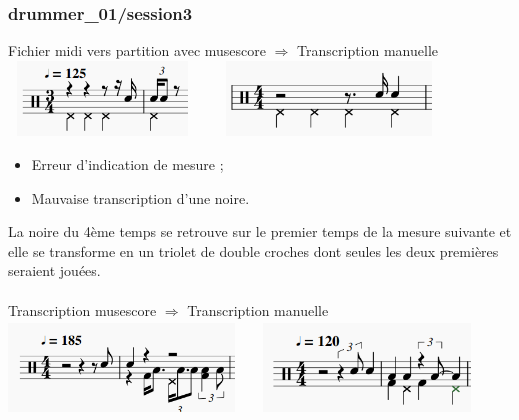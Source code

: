 \subsubsection{drummer\_01/session3}
Fichier midi vers partition avec musescore $\Rightarrow$ Transcription manuelle\\
\includegraphics[height=20mm, width=50mm]{z_images/4_experimentations/1_analyse_midi_audio/0_drummer1_session3/0_musescore.png}\ \ \ \ 
\includegraphics[height=20mm, width=55mm]{z_images/4_experimentations/1_analyse_midi_audio/0_drummer1_session3/1_manuelle.png}
\begin{itemize}
	\item Erreur d’indication de mesure ;
	\item Mauvaise transcription d’une noire.\\
\end{itemize}
La noire du 4ème temps se retrouve sur le premier temps de la mesure suivante et elle se transforme en un triolet de double croches dont seules les deux premières seraient jouées.\\\\
Transcription musescore $\Rightarrow$ Transcription manuelle\\
\includegraphics[height=25mm, width=60mm]{z_images/4_experimentations/1_analyse_midi_audio/0_drummer1_session3/2_musescore.png}\ \ \ \ 
\includegraphics[height=25mm, width=55mm]{z_images/4_experimentations/1_analyse_midi_audio/0_drummer1_session3/3_manuelle.png}
